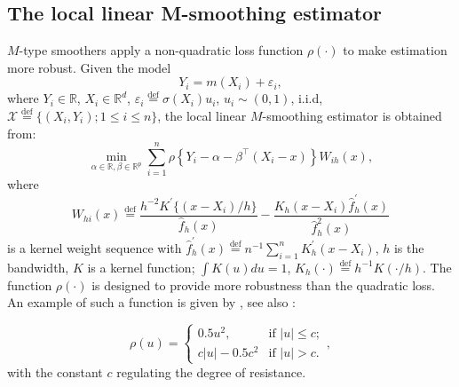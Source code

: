 \documentclass{rQUF2e}
\theoremstyle{plain}
\theoremstyle{definition}
\begin{document}
	\subsection{The local linear M-smoothing estimator} 
	\label{app2}
	$M$-type smoothers apply a non-quadratic loss function $\rho(\cdot)$ to make estimation more robust. Given the model 
	\begin{equation}
	Y_i = m(X_i) + \varepsilon_i,
	\label{varestr}
	\end{equation}
	where $Y_i \in \mathbb{R}$, $X_i \in \mathbb{R}^d$, $\varepsilon_i \stackrel{\operatorname{def}}{=} \sigma (X_i) u_i$, $u_i \sim (0,1)$, i.i.d, $\mathcal{X} \stackrel{\operatorname{def}}{=} \{(X_i,Y_i); 1 \leq i \leq n\}$, the local linear $M$-smoothing estimator is obtained from:
	\begin{equation}
	\underset{\alpha \in \mathbb{R}, \beta \in \mathbb{R}^p}{\min} \sum_{i=1}^n \rho\left\{ Y_i - \alpha - \beta^{\top}(X_i - x) \right\} W_{ih}(x),
	\end{equation}
	where 
	\begin{equation}
	W_{hi}(x) \stackrel{\operatorname{def}}{=} \frac{h^{-2} K^{'} \{(x-X_i)/h\}}{\widehat{f}_h(x)} - \frac{K_h (x-X_i) \widehat{f}^{'}_h(x)}{\widehat{f}^{2}_h(x)}
	\end{equation}
	is a kernel weight sequence with $\widehat{f}^{'}_h(x) \stackrel{\operatorname{def}}{=} n^{-1} \sum_{i=1}^n K_h^{'}(x-X_i)$, $h$ is the bandwidth, $K$ is a kernel function; $\int K(u)du = 1$, $K_h(\cdot) \stackrel{\operatorname{def}}{=} h^{-1}K(\cdot/h)$. The function $\rho(\cdot)$ is designed to provide more robustness than the quadratic loss. An example of such a function is given by \citet{huber}, see also \citet{haerdle_paper_asy}:
	
	\begin{equation}
	\rho(u) = \left\{ \begin{array}{ll}
	0.5 u^2, & \mbox{if $|u| \leq c$};\\
	c|u|-0.5 c^2 & \mbox{if $|u| > c$}.\end{array} \right. ,
	\end{equation}
	with the constant $c$ regulating the degree of resistance.
	
	
\end{document}
